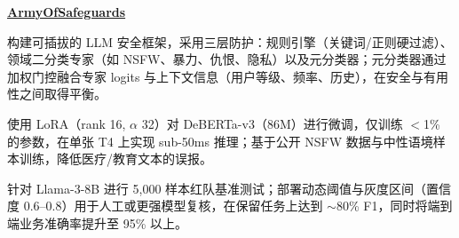 \begin{twocolentry}{}
\href{https://github.com/faketut/ArmyOfSafeguards}{\textbf{ArmyOfSafeguards}}
\end{twocolentry}
\begin{onecolentry}
\begin{highlights}
\item 构建可插拔的 LLM 安全框架，采用三层防护：规则引擎（关键词/正则硬过滤）、领域二分类专家（如 NSFW、暴力、仇恨、隐私）以及元分类器；元分类器通过加权门控融合专家 logits 与上下文信息（用户等级、频率、历史），在安全与有用性之间取得平衡。
\item 使用 LoRA（rank 16, $\alpha$ 32）对 DeBERTa-v3（86M）进行微调，仅训练 $<$1\% 的参数，在单张 T4 上实现 sub-50ms 推理；基于公开 NSFW 数据与中性语境样本训练，降低医疗/教育文本的误报。
\item 针对 Llama-3-8B 进行 5,000 样本红队基准测试；部署动态阈值与灰度区间（置信度 0.6--0.8）用于人工或更强模型复核，在保留任务上达到 $\sim$80\% F1，同时将端到端业务准确率提升至 95\% 以上。
\end{highlights}
\end{onecolentry}

